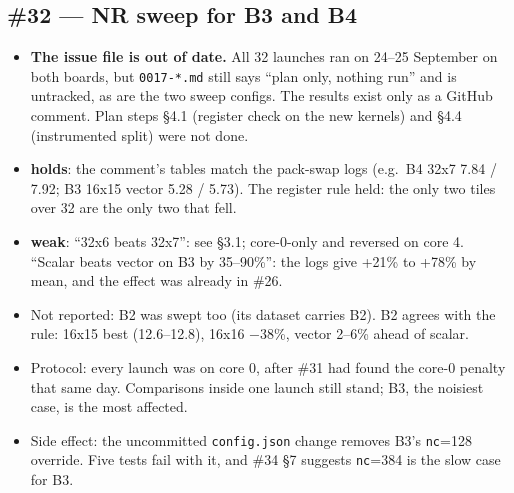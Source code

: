 \documentclass[10pt,a4paper]{article}
\newcommand{\ok}{\textcolor{green!45!black}{\textbf{holds}}}
\newcommand{\weak}{\textcolor{orange!80!black}{\textbf{weak}}}
\begin{document}
\subsection*{\#32 --- NR sweep for B3 and B4}
\begin{itemize}
  \item \textbf{The issue file is out of date.} All 32 launches ran on 24--25 September on both boards,
  but \texttt{0017-*.md} still says ``plan only, nothing run'' and is untracked, as are the two sweep
  configs. The results exist only as a GitHub comment. Plan steps \S4.1 (register check on the new
  kernels) and \S4.4 (instrumented split) were not done.
  \item \ok: the comment's tables match the pack-swap logs (e.g.\ B4 32x7 7.84 / 7.92; B3 16x15 vector
  5.28 / 5.73). The register rule held: the only two tiles over 32 are the only two that fell.
  \item \weak: ``32x6 beats 32x7'': see \S3.1; core-0-only and reversed on core 4. ``Scalar beats
  vector on B3 by 35--90\%'': the logs give +21\% to +78\% by mean, and the effect was already in
  \#26.
  \item Not reported: B2 was swept too (its dataset carries B2). B2 agrees with the rule: 16x15 best
  (12.6--12.8), 16x16 $-$38\%, vector 2--6\% ahead of scalar.
  \item Protocol: every launch was on core 0, after \#31 had found the core-0 penalty that same day.
  Comparisons inside one launch still stand; B3, the noisiest case, is the most affected.
  \item Side effect: the uncommitted \texttt{config.json} change removes B3's \texttt{nc}=128 override.
  Five tests fail with it, and \#34 \S7 suggests \texttt{nc}=384 is the slow case for B3.
\end{itemize}
\end{document}
